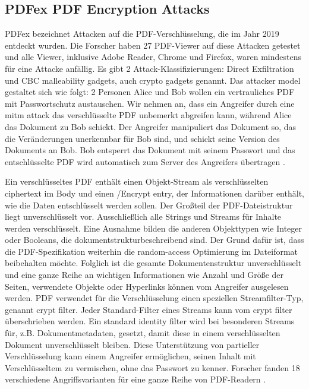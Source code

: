 \subsection{PDFex PDF Encryption Attacks}
PDFex bezeichnet Attacken auf die PDF-Verschlüsselung, die im Jahr 2019 entdeckt wurden. Die Forscher haben 27 PDF-Viewer auf diese Attacken getestet und alle Viewer, inklusive Adobe Reader, Chrome und Firefox, waren mindestens für eine Attacke anfällig. Es gibt 2 Attack-Klassifizierungen: Direct Exfiltration und CBC malleability gadgets, auch crypto gadgets genannt. Das attacker model gestaltet sich wie folgt: 2 Personen Alice und Bob wollen ein vertrauliches PDF mit Passwortschutz austauschen. Wir nehmen an, dass ein Angreifer durch eine \gls{mitm} attack das verschlüsselte PDF unbemerkt abgreifen kann, während Alice das Dokument zu Bob schickt. Der Angreifer manipuliert das Dokument so, das die Veränderungen unerkennbar für Bob sind, und schickt seine Version des Dokuments an Bob. Bob entsperrt das Dokument mit seinem Passwort und das entschlüsselte PDF wird automatisch zum Server des Angreifers übertragen \cite{ccc-break-pdf, pdfex}.
\par
Ein verschlüsseltes PDF enthält einen Objekt-Stream als verschlüsselten ciphertext im Body und einen /Encrypt entry, der Informationen darüber enthält, wie die Daten entschlüsselt werden sollen. Der Großteil der PDF-Dateistruktur liegt unverschlüsselt vor. Ausschließlich alle Strings und Streams für Inhalte werden verschlüsselt. Eine Ausnahme bilden die anderen Objekttypen wie Integer oder Booleans, die dokumentstrukturbeschreibend sind. Der Grund dafür ist, dass die PDF-Spezifikation weiterhin die random-access Optimierung im Dateiformat beibehalten möchte. Folglich ist die gesamte Dokumentenstruktur unverschlüsselt und eine ganze Reihe an wichtigen Informationen wie Anzahl und Größe der Seiten, verwendete Objekte oder Hyperlinks können vom Angreifer ausgelesen werden. PDF verwendet für die Verschlüsselung einen speziellen Streamfilter-Typ, genannt crypt filter. Jeder Standard-Filter eines Streams kann vom crypt filter überschrieben werden. Ein standard identity filter wird bei besonderen Streams für, z.B. Dokumentmetadaten, gesetzt, damit diese in einem verschlüsselten Dokument unverschlüsselt bleiben. Diese Unterstützung von partieller Verschlüsselung kann einem Angreifer ermöglichen, seinen Inhalt mit Verschlüsseltem zu vermischen, ohne das Passwort zu kenner. Forscher fanden 18 verschiedene Angriffsvarianten für eine ganze Reihe von PDF-Readern \cite{ccc-break-pdf}.
\par
